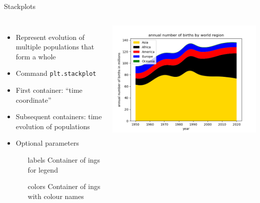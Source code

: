 \begin{frame}[fragile]{Stackplots}
%
\begin{columns}
\begin{itemize}
\item Represent evolution of multiple populations that form a whole
\item Command \texttt{plt.stackplot}
\item First container: \enquote{time coordinate}
\item Subsequent containers: time evolution of populations
\item Optional parameters

	\begin{minipage}{.05\linewidth}
		\phantom{x}
	\end{minipage}
	\begin{minipage}{.90\linewidth}
		\begin{itemize}
		\item[labels] Container of ings for legend
		\item[colors] Container of ings with colour names
		\end{itemize}
	\end{minipage}
\end{itemize}
%
\begin{tcolorbox}[title=Stackplot]
	\includegraphics[width=\linewidth]{./gfx/plt-stackplot}
\end{tcolorbox}
\end{columns}
%
\end{frame}

